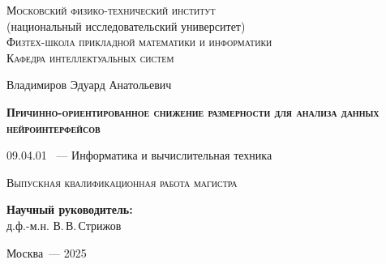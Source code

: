 \thispagestyle{empty}

\begin{titlepage}
	\begin{center}
		\textsc{Московский физико-технический институт}\\
		(национальный исследовательский университет)\\
		\textsc{Физтех-школа прикладной математики и информатики}\\
		\textsc{Кафедра интеллектуальных систем}
	\end{center}
	\vspace{2.5cm}
	\begin{center}
		{Владимиров Эдуард Анатольевич}
		\par
		\vspace{2cm}
		{\Large \textsc{\textbf{Причинно-ориентированное снижение размерности для анализа данных нейроинтерфейсов}}}
		\par
		\vspace{2cm}
		{09.04.01 ~--- Информатика и вычислительная техника}
		\par
		\vspace{2cm}
		\textsc{Выпускная квалификационная работа магистра}
	\end{center}
	\vspace{2cm}
	\hfill\parbox{8,4cm}{\textbf{Научный руководитель:}
		\\д.ф.-м.н. В.\,В.\,Стрижов}
	\par
	\vspace{2cm}
	\begin{center}
		{Москва~--- 2025}
	\end{center}
\end{titlepage}